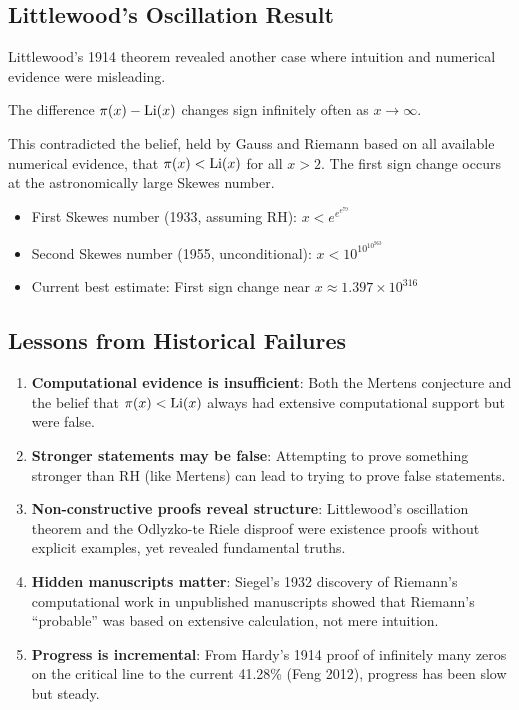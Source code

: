 \subsection{Littlewood's Oscillation Result}

Littlewood's 1914 theorem revealed another case where intuition and numerical evidence were misleading.

\begin{theorem}[Littlewood, 1914]
The difference $\pi(x) - \operatorname{Li}(x)$ changes sign infinitely often as $x \to \infty$.
\end{theorem}

This contradicted the belief, held by Gauss and Riemann based on all available numerical evidence, that $\pi(x) < \operatorname{Li}(x)$ for all $x > 2$. The first sign change occurs at the astronomically large Skewes number.

\begin{definition}
\begin{itemize}
\item First Skewes number (1933, assuming RH): $x < e^{e^{e^{79}}}$
\item Second Skewes number (1955, unconditional): $x < 10^{10^{10^{963}}}$
\item Current best estimate: First sign change near $x \approx 1.397 \times 10^{316}$
\end{itemize}
\end{definition}

\subsection{Lessons from Historical Failures}

\begin{assessment}
\begin{enumerate}
\item \textbf{Computational evidence is insufficient}: Both the Mertens conjecture and the belief that $\pi(x) < \operatorname{Li}(x)$ always had extensive computational support but were false.

\item \textbf{Stronger statements may be false}: Attempting to prove something stronger than RH (like Mertens) can lead to trying to prove false statements.

\item \textbf{Non-constructive proofs reveal structure}: Littlewood's oscillation theorem and the Odlyzko-te Riele disproof were existence proofs without explicit examples, yet revealed fundamental truths.

\item \textbf{Hidden manuscripts matter}: Siegel's 1932 discovery of Riemann's computational work in unpublished manuscripts showed that Riemann's ``probable'' was based on extensive calculation, not mere intuition.

\item \textbf{Progress is incremental}: From Hardy's 1914 proof of infinitely many zeros on the critical line to the current 41.28\% (Feng 2012), progress has been slow but steady.
\end{enumerate}
\end{assessment}

